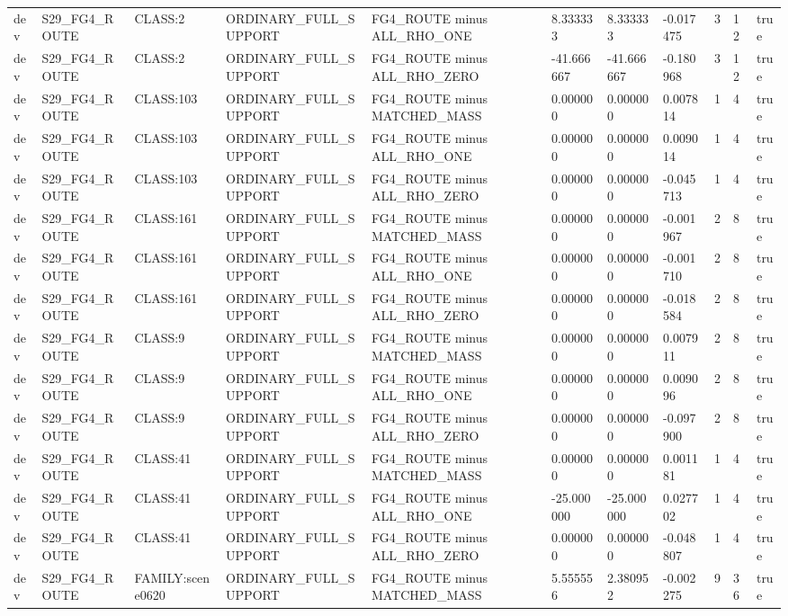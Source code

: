 \begin{tabular}{lllllllllll}
dev & S29\_FG4\_ROUTE & CLASS:2 & ORDINARY\_FULL\_SUPPORT & FG4\_ROUTE minus ALL\_RHO\_ONE & 8.333333 & 8.333333 & -0.017475 & 3 & 12 & true \\
dev & S29\_FG4\_ROUTE & CLASS:2 & ORDINARY\_FULL\_SUPPORT & FG4\_ROUTE minus ALL\_RHO\_ZERO & -41.666667 & -41.666667 & -0.180968 & 3 & 12 & true \\
dev & S29\_FG4\_ROUTE & CLASS:103 & ORDINARY\_FULL\_SUPPORT & FG4\_ROUTE minus MATCHED\_MASS & 0.000000 & 0.000000 & 0.007814 & 1 & 4 & true \\
dev & S29\_FG4\_ROUTE & CLASS:103 & ORDINARY\_FULL\_SUPPORT & FG4\_ROUTE minus ALL\_RHO\_ONE & 0.000000 & 0.000000 & 0.009014 & 1 & 4 & true \\
dev & S29\_FG4\_ROUTE & CLASS:103 & ORDINARY\_FULL\_SUPPORT & FG4\_ROUTE minus ALL\_RHO\_ZERO & 0.000000 & 0.000000 & -0.045713 & 1 & 4 & true \\
dev & S29\_FG4\_ROUTE & CLASS:161 & ORDINARY\_FULL\_SUPPORT & FG4\_ROUTE minus MATCHED\_MASS & 0.000000 & 0.000000 & -0.001967 & 2 & 8 & true \\
dev & S29\_FG4\_ROUTE & CLASS:161 & ORDINARY\_FULL\_SUPPORT & FG4\_ROUTE minus ALL\_RHO\_ONE & 0.000000 & 0.000000 & -0.001710 & 2 & 8 & true \\
dev & S29\_FG4\_ROUTE & CLASS:161 & ORDINARY\_FULL\_SUPPORT & FG4\_ROUTE minus ALL\_RHO\_ZERO & 0.000000 & 0.000000 & -0.018584 & 2 & 8 & true \\
dev & S29\_FG4\_ROUTE & CLASS:9 & ORDINARY\_FULL\_SUPPORT & FG4\_ROUTE minus MATCHED\_MASS & 0.000000 & 0.000000 & 0.007911 & 2 & 8 & true \\
dev & S29\_FG4\_ROUTE & CLASS:9 & ORDINARY\_FULL\_SUPPORT & FG4\_ROUTE minus ALL\_RHO\_ONE & 0.000000 & 0.000000 & 0.009096 & 2 & 8 & true \\
dev & S29\_FG4\_ROUTE & CLASS:9 & ORDINARY\_FULL\_SUPPORT & FG4\_ROUTE minus ALL\_RHO\_ZERO & 0.000000 & 0.000000 & -0.097900 & 2 & 8 & true \\
dev & S29\_FG4\_ROUTE & CLASS:41 & ORDINARY\_FULL\_SUPPORT & FG4\_ROUTE minus MATCHED\_MASS & 0.000000 & 0.000000 & 0.001181 & 1 & 4 & true \\
dev & S29\_FG4\_ROUTE & CLASS:41 & ORDINARY\_FULL\_SUPPORT & FG4\_ROUTE minus ALL\_RHO\_ONE & -25.000000 & -25.000000 & 0.027702 & 1 & 4 & true \\
dev & S29\_FG4\_ROUTE & CLASS:41 & ORDINARY\_FULL\_SUPPORT & FG4\_ROUTE minus ALL\_RHO\_ZERO & 0.000000 & 0.000000 & -0.048807 & 1 & 4 & true \\
dev & S29\_FG4\_ROUTE & FAMILY:scene0620 & ORDINARY\_FULL\_SUPPORT & FG4\_ROUTE minus MATCHED\_MASS & 5.555556 & 2.380952 & -0.002275 & 9 & 36 & true \\

\end{tabular}

